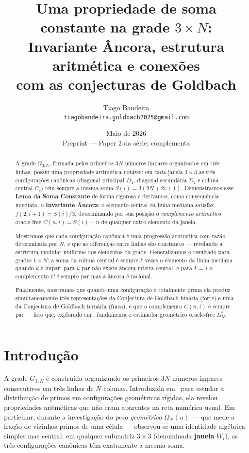 \documentclass[12pt, a4paper]{article}
\title{Uma propriedade de soma constante na grade $3\times N$:\\
	Invariante Âncora, estrutura aritmética e conexões\\
	com as conjecturas de Goldbach}
\author{Tiago Bandeira\\
	\small\texttt{tiagobandeira.goldbach2025@gmail.com}}
\date{Maio de 2026\\[4pt]
	\small Preprint — Paper 2 da série; complementa \cite{bandeira2026}}
\begin{document}
	
	\maketitle
	
	\begin{abstract}
		A grade $G_{3,N}$, formada pelos primeiros $3N$ números ímpares organizados em três
		linhas, possui uma propriedade aritmética notável: em cada janela $3\times 3$ as três
		configurações canônicas (diagonal principal $D_1$, diagonal secundária $D_2$ e coluna
		central $C_v$) têm sempre a mesma soma $S(i)=3(2N+2i+1)$. Demonstramos esse
		\textbf{Lema da Soma Constante} de forma rigorosa e derivamos, como consequência
		imediata, o \textbf{Invariante Âncora}: o elemento central da linha mediana satisfaz
		$f(2,i{+}1)=S(i)/3$, determinando por sua posição o \textit{complemento aritmético}
		oracle-free $C(n,i)=S(i)-n$ de qualquer outro elemento da janela.
		
		Mostramos que cada configuração canônica é uma progressão aritmética com razão
		determinada por $N$, e que as diferenças entre linhas são constantes — revelando a
		estrutura modular uniforme dos elementos da grade. Generalizamos o resultado para
		grades $k\times N$: a soma da coluna central é sempre $k$ vezes o elemento da linha
		mediana quando $k$ é ímpar; para $k$ par não existe âncora inteira central, e para
		$k=4$ o complemento $C$ é sempre par mas a âncora é racional.
		
		Finalmente, mostramos que quando uma configuração é totalmente prima ela produz
		simultaneamente três representações da Conjectura de Goldbach binária (forte) e uma
		da Conjectura de Goldbach ternária (fraca), e que o complemento $C(n,i)$ é sempre
		par — fato que, explorado em \cite{bandeira2026c}, fundamenta o estimador
		geométrico oracle-free $\Omega^*_N$.
	\end{abstract}
	
	\tableofcontents
	\bigskip
	
	\section{Introdução}
	
	A grade $G_{3,N}$ é construída organizando os primeiros $3N$ números ímpares
	consecutivos em três linhas de $N$ colunas. Introduzida em~\cite{bandeira2026} para
	estudar a distribuição de primos em configurações geométricas rígidas, ela revelou
	propriedades aritméticas que não eram aparentes na reta numérica usual. Em particular,
	durante a investigação do \textit{peso geométrico} $\Omega_N(n)$ — que mede a fração
	de vizinhos primos de uma célula — observou-se uma identidade algébrica simples mas
	central: em qualquer submatriz $3\times 3$ (denominada \textbf{janela} $W_i$), as três
	configurações canônicas têm exatamente a mesma soma.
	
\end{document}
